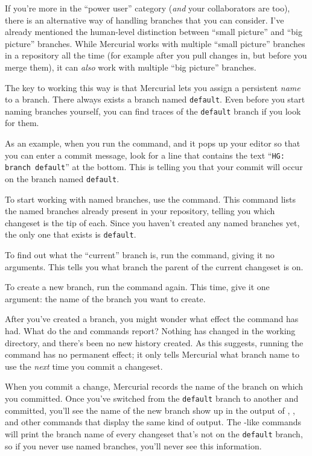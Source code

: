 If you're more in the ``power user'' category (\emph{and} your
collaborators are too), there is an alternative way of handling
branches that you can consider.  I've already mentioned the
human-level distinction between ``small picture'' and ``big picture''
branches.  While Mercurial works with multiple ``small picture''
branches in a repository all the time (for example after you pull
changes in, but before you merge them), it can \emph{also} work with
multiple ``big picture'' branches.

The key to working this way is that Mercurial lets you assign a
persistent \emph{name} to a branch.  There always exists a branch
named \texttt{default}.  Even before you start naming branches
yourself, you can find traces of the \texttt{default} branch if you
look for them.

As an example, when you run the  command, and it pops up
your editor so that you can enter a commit message, look for a line
that contains the text ``\texttt{HG: branch default}'' at the bottom.
This is telling you that your commit will occur on the branch named
\texttt{default}.

To start working with named branches, use the 
command.  This command lists the named branches already present in
your repository, telling you which changeset is the tip of each.
Since you haven't created any named branches yet, the only one that
exists is \texttt{default}.

To find out what the ``current'' branch is, run the 
command, giving it no arguments.  This tells you what branch the
parent of the current changeset is on.

To create a new branch, run the  command again.  This
time, give it one argument: the name of the branch you want to create.

After you've created a branch, you might wonder what effect the
 command has had.  What do the  and
 commands report?
Nothing has changed in the working directory, and there's been no new
history created.  As this suggests, running the  command
has no permanent effect; it only tells Mercurial what branch name to
use the \emph{next} time you commit a changeset.

When you commit a change, Mercurial records the name of the branch on
which you committed.  Once you've switched from the \texttt{default}
branch to another and committed, you'll see the name of the new branch
show up in the output of , , and other commands
that display the same kind of output.
The -like commands will print the branch name of every
changeset that's not on the \texttt{default} branch, so if you never
use named branches, you'll never see this information.

